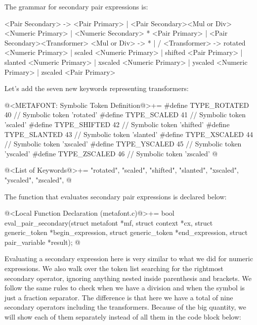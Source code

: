 
The grammar for secondary pair expressions is:

\alinhaverbatim
<Pair Secondary> -> <Pair Primary> |
                    <Pair Secondary><Mul or Div><Numeric Primary> |
                    <Numeric Secondary> * <Pair Primary> |
                    <Pair Secondary><Transformer>
<Mul or Div> -> * | /
<Transformer> -> rotated <Numeric Primary> |
                 scaled <Numeric Primary> |
                 shifted <Pair Primary> |
                 slanted <Numeric Primary> |
                 xscaled <Numeric Primary> |
                 yscaled <Numeric Primary> |
                 zscaled <Pair Primary>
\alinhanormal

Let's add the seven new keywords representing transformers:

\iniciocodigo
@<METAFONT: Symbolic Token Definition@>+=
#define TYPE_ROTATED  40 // Symbolic token 'rotated'
#define TYPE_SCALED   41 // Symbolic token 'scaled'
#define TYPE_SHIFTED  42 // Symbolic token 'shifted'
#define TYPE_SLANTED  43 // Symbolic token 'slanted'
#define TYPE_XSCALED  44 // Symbolic token 'xscaled'
#define TYPE_YSCALED  45 // Symbolic token 'yscaled'
#define TYPE_ZSCALED  46 // Symbolic token 'zscaled'
@
\fimcodigo

\iniciocodigo
@<List of Keywords@>+=
"rotated", "scaled", "shifted", "slanted", "xscaled", "yscaled",
"zscaled",
@
\fimcodigo


The function that evaluates secondary pair expressions is declared
below:

\iniciocodigo
@<Local Function Declaration (metafont.c)@>+=
bool eval_pair_secondary(struct metafont *mf, struct context *cx,
                         struct generic_token *begin_expression,
                         struct generic_token *end_expression,
                         struct pair_variable *result);
@
\fimcodigo

Evaluating a secondary expression here is very similar to what we did
for numeric expressions. We also walk over the token list searching
for the rightmost secondary operator, ignoring anything nested inside
parenthesis and brackets. We follow the same rules to check when we
have a division and when the symbol \monoespaco{/} is just a fraction
separator. The difference is that here we have a total of nine
secondary operators including the transformers. Because of the big
quantity, we will show each of them separately instead of all them in
the code block below:

